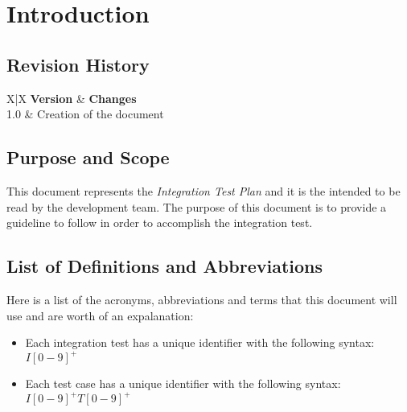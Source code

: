\section{Introduction} %
\label{sec:introduction}

\subsection{Revision History} %
\label{sub:revision_history}
\begin{tabularx}{\textwidth}{ X|X }
	\textbf{Version} & \textbf{Changes} \\ \hline
	 {1.0} & Creation of the document \\
\end{tabularx}

\subsection{Purpose and Scope} %
\label{sub:purpose_and_scope}

This document represents the \emph{Integration Test Plan} and it is the intended to be read by the development team.
The purpose of this document is to provide a guideline to follow in order to accomplish the integration test.


\subsection{List of Definitions and Abbreviations} %
\label{sub:definitions_and_abbreviations}
Here is a list of the acronyms, abbreviations and terms that this document will use and are worth of an expalanation:

\begin{itemize}
	\item Each integration test has a unique identifier with the following syntax: \newline $I[0-9]^+$
	\item Each test case has a unique identifier with the following syntax: \newline $I[0-9]^+T[0-9]^+$
\end{itemize}


